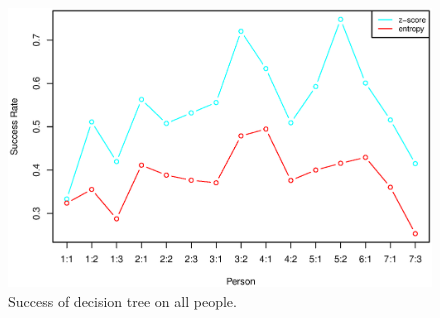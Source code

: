 \begin{figure}[H]
\includegraphics[width = \textwidth]{graphics/tree_success_all}
\caption{Success of decision tree on all people.}
\label{fig:tree_success_all}
\end{figure}
